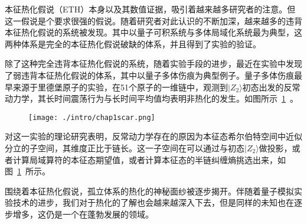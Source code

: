 本征热化假说（ETH）本身以及其数值证据，吸引着越来越多研究者的注意。但这一假说是个要求很强的假说。随着研究者对此认识的不断加深，越来越多的违背本征热化假说的系统被发现。其中以量子可积系统\cite{kinoshita2006quantum,Rigol2007Relaxation,Calabrese2011Quantum,essler2016quench,vidmar2016generalized}与多体局域化系统\cite{basko2006metal,Serbyn2013local,Huse2014Phenomenology}最为典型，这两种体系是完全的本征热化假说破缺的体系，并且得到了实验的验证。


除了这种完全违背本征热化假说的系统，随着实验手段的进步，最近在实验中发现了弱违背本征热化假说的体系，其中以量子多体伤痕为典型例子。量子多体伤痕最早来源于里德堡原子的实验，在51个原子的一维链中，观测到$|Z_2\rangle$初态出发的反常动力学，其长时间震荡行为与长时间平均值均表明非热化的发生\cite{bernien2017probing}。如图所示~\ref{scar}~。
\begin{figure}[!htbp]
    \centering
    \texttt{[image: ./intro/chap1scar.png]}
    \label{scar}
\end{figure}
对这一实验的理论研究表明，反常动力学存在的原因为本征态希尔伯特空间中近似分立的子空间，其维度正比于链长。这一子空间在可以通过与初态$|Z_2\rangle$做投影，或者计算局域算符的本征态期望值，或者计算本征态的半链纠缠熵挑选出来\cite{turner2018weak,Turner2018quantum,Ho2019periodic,Choi2019emergent,Michailidis2020slow,serbyn2021quantum}，如图~\ref{scar}~所示。

围绕着本征热化假说，孤立体系的热化的神秘面纱被逐步揭开。伴随着量子模拟实验技术的进步，我们对于热化的了解也会越来越深入下去，但是同样的未知也在逐步增多，这仍是一个在蓬勃发展的领域。





